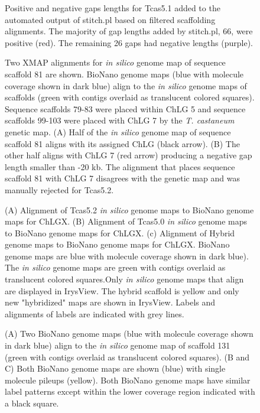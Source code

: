 \documentclass{bmcart}
\begin{document}
\begin{backmatter}
\begin{figure}[h!]
{ Positive and negative gaps lengths for Tcas5.1 added to the automated output of stitch.pl based on filtered scaffolding alignments. The majority of gap lengths added by stitch.pl, 66, were positive (red). The remaining 26 gaps had negative lengths (purple).}
      \end{figure}                      
\begin{figure}[h!]
	\caption{
 Two XMAP alignments for \textit{in silico} genome map of sequence scaffold 81 are shown. BioNano genome maps (blue with molecule coverage shown in dark blue) align to the \textit{in silico} genome maps of scaffolds (green with contigs overlaid as translucent colored squares). Sequence scaffolds 79-83 were placed within ChLG 5 and sequence scaffolds 99-103 were placed with ChLG 7 by the \textit{T. castaneum} genetic map. (A) Half of the \textit{in silico} genome map of sequence scaffold 81 aligns with its assigned ChLG (black arrow). (B) The other half aligns with ChLG 7 (red arrow) producing a negative gap length smaller than -20 kb. The alignment that places sequence scaffold 81 with ChLG 7 disagrees with the genetic map and was manually rejected for Tcas5.2.}
      \end{figure} 

\begin{figure}[h!]
	\caption{
 (A) Alignment of Tcas5.2 \textit{in silico} genome maps to BioNano genome maps for ChLGX. (B) Alignment of Tcas5.0 \textit{in silico} genome maps to BioNano genome maps for ChLGX. (c) Alignment of Hybrid genome maps to BioNano genome maps for ChLGX. BioNano genome maps are blue with molecule coverage shown in dark blue). The \textit{in silico} genome maps are green with contigs overlaid as translucent colored squares.Only \textit{in silico} genome maps that align are displayed in IrysView. The hybrid scaffold is yellow and only new "hybridized" maps are shown in IrysView. Labels and alignments of labels are indicated with grey lines. }
      \end{figure}  
\begin{figure}[h!]
	\caption{
 (A) Two BioNano genome maps (blue with molecule coverage shown in dark blue) align to the \textit{in silico} genome map of scaffold 131 (green with contigs overlaid as translucent colored squares). (B and C) Both BioNano genome maps are shown (blue) with single molecule pileups (yellow). Both BioNano genome maps have similar label patterns except within the lower coverage region indicated with a black square.}
\end{figure}            



\end{backmatter}
\end{document}

